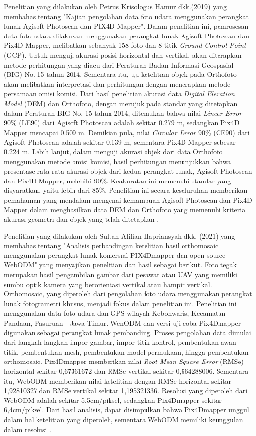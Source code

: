 \par Penelitian yang dilakukan oleh Petrus Krisologus Hamur dkk.(2019) yang membahas tentang "Kajian pengolahan data foto udara menggunakan perangkat lunak Agisoft Photoscan dan PIX4D Mapper". Dalam penelitian ini, pemrosesan data foto udara dilakukan menggunakan perangkat lunak Agisoft Photoscan dan Pix4D Mapper, melibatkan sebanyak 158 foto dan 8 titik \textit{Ground Control Point} (GCP). Untuk menguji akurasi posisi horizontal dan vertikal, akan diterapkan metode perhitungan yang diacu dari Peraturan Badan Informasi Geospasial (BIG) No. 15 tahun 2014. Sementara itu, uji ketelitian objek pada Orthofoto akan melibatkan interpretasi dan perhitungan dengan menerapkan metode persamaan omisi komisi. Dari hasil penelitian akurasi data \textit{Digital Elevation Model} (DEM) dan Orthofoto, dengan merujuk pada standar yang ditetapkan dalam Peraturan BIG No. 15 tahun 2014, ditemukan bahwa nilai \textit{Linear Error} 90\% (LE90) dari Agisoft Photoscan adalah sekitar 0.279 m, sedangkan Pix4D Mapper mencapai 0.509 m. Demikian pula, nilai \textit{Circular Error} 90\% (CE90) dari Agisoft Photoscan adalah sekitar 0.139 m, sementara Pix4D Mapper sebesar 0.224 m. Lebih lanjut, dalam menguji akurasi objek dari data Orthofoto menggunakan metode omisi komisi, hasil perhitungan menunjukkan bahwa presentase rata-rata akurasi objek dari kedua perangkat lunak, Agisoft Photoscan dan Pix4D Mapper, melebihi 90\%. Keakuratan ini memenuhi standar yang disyaratkan, yaitu lebih dari 85\%. Penelitian ini secara keseluruhan memberikan pemahaman yang mendalam mengenai kemampuan Agisoft Photoscan dan Pix4D Mapper dalam menghasilkan data DEM dan Orthofoto yang memenuhi kriteria akurasi geometri dan objek yang telah ditetapkan \citep{hamur2019kajian}.

Penelitian yang dilakukan oleh Sultan Alifian Hapriansyah dkk. (2021) yang membahas tentang "Analisis perbandingan ketelitian hasil orthomosaic menggunakan perangkat lunak komersial PIX4Dmapper dan open source WebODM" yang menyajikan penelitian dan hasil sebagai berikut. Foto tegak merupakan hasil pengambilan gambar dari pesawat atau UAV yang memiliki sumbu optik kamera yang berorientasi vertikal atau hampir vertikal. Orthomosaic, yang diperoleh dari pengolahan foto udara menggunakan perangkat lunak fotogrametri khusus, menjadi fokus dalam penelitian ini. Penelitian ini menggunakan data foto udara dan GPS wilayah Kebonwaris, Kecamatan Pandaan, Pasuruan - Jawa Timur. WenODM dan versi uji coba Pix4Dmapper digunakan sebagai perangkat lunak pembanding. Proses pengolahan data dimulai dari langkah-langkah impor gambar, impor titik kontrol, pembentukan awan titik, pembentukan mesh, pembentukan model permukaan, hingga pembentukan orthomosaic. Pix4Dmapper memberikan nilai \textit{Root Mean Square Error} (RMSe) horizontal sekitar 0,67361672 dan RMSe vertikal sekitar 0,664288006. Sementara itu, WebODM memberikan nilai ketelitian dengan RMSe horizontal sekitar 1,92810327 dan RMSe vertikal sekitar 1,195321336. Resolusi yang diperoleh dari WebODM adalah sekitar 5,5cm/piksel, sedangkan Pix4Dmapper sekitar 6,4cm/piksel. Dari hasil analisis, dapat disimpulkan bahwa Pix4Dmapper unggul dalam hal ketelitian yang diperoleh, sementara WebODM memiliki keunggulan dalam resolusi \citep{hapriansyah2021analisis}.


